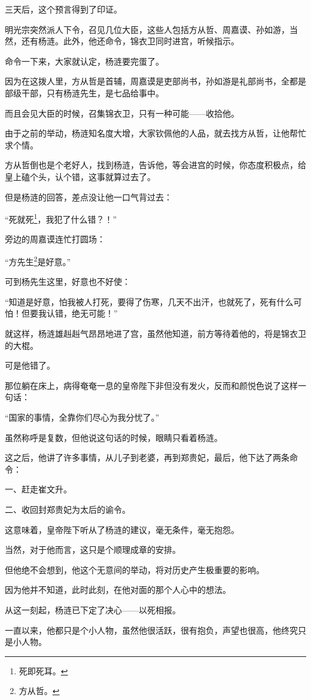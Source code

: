 \begin{multicols}{\theparacolNo}
		三天后，这个预言得到了印证。

		明光宗突然派人下令，召见几位大臣，这些人包括方从哲、周嘉谟、孙如游，当然，还有杨涟。此外，他还命令，锦衣卫同时进宫，听候指示。

		命令一下来，大家就认定，杨涟要完蛋了。

		因为在这拨人里，方从哲是首辅，周嘉谟是吏部尚书，孙如游是礼部尚书，全都是部级干部，只有杨涟先生，是七品给事中。

		而且会见大臣的时候，召集锦衣卫，只有一种可能——收拾他。

		由于之前的举动，杨涟知名度大增，大家钦佩他的人品，就去找方从哲，让他帮忙求个情。

		方从哲倒也是个老好人，找到杨涟，告诉他，等会进宫的时候，你态度积极点，给皇上磕个头，认个错，这事就算过去了。

		但是杨涟的回答，差点没让他一口气背过去：

		“死就死\footnote{死即死耳。}，我犯了什么错？！”

		旁边的周嘉谟连忙打圆场：

		“方先生\footnote{方从哲。}是好意。”

		可到杨先生这里，好意也不好使：

		“知道是好意，怕我被人打死，要得了伤寒，几天不出汗，也就死了，死有什么可怕！但要我认错，绝无可能！”

		就这样，杨涟雄赳赳气昂昂地进了宫，虽然他知道，前方等待着他的，将是锦衣卫的大棍。

		可是他错了。

		那位躺在床上，病得奄奄一息的皇帝陛下非但没有发火，反而和颜悦色说了这样一句话：

		“国家的事情，全靠你们尽心为我分忧了。”

		虽然称呼是复数，但他说这句话的时候，眼睛只看着杨涟。

		这之后，他讲了许多事情，从儿子到老婆，再到郑贵妃，最后，他下达了两条命令：

		一、赶走崔文升。

		二、收回封郑贵妃为太后的谕令。

		这意味着，皇帝陛下听从了杨涟的建议，毫无条件，毫无抱怨。

		当然，对于他而言，这只是个顺理成章的安排。

		但他绝不会想到，他这个无意间的举动，将对历史产生极重要的影响。

		因为他并不知道，此时此刻，在他对面的那个人心中的想法。

		从这一刻起，杨涟已下定了决心——以死相报。

		一直以来，他都只是个小人物，虽然他很活跃，很有抱负，声望也很高，他终究只是小人物。


\end{multicols}
